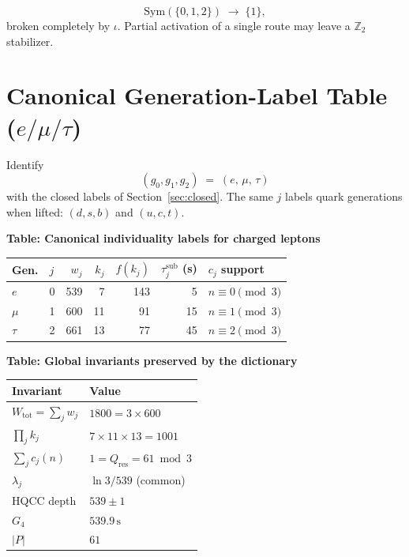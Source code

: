 \begin{corollary}
\[
\mathrm{Sym}(\{0,1,2\})\;\longrightarrow\;\{1\},
\]
broken completely by \(\iota\). Partial activation of a single route may leave
a \(\mathbb{Z}_2\) stabilizer.
\end{corollary}

\section{Canonical Generation-Label Table (\(e/\mu/\tau\))}
\label{sec:table}

\begin{definition}
\label{def:leptons}
Identify
\[
(g_0,g_1,g_2) \;=\; (e,\,\mu,\,\tau)
\]
with the closed labels of Section~\ref{sec:closed}. The same \(j\) labels quark
generations when lifted: \((d,s,b)\) and \((u,c,t)\).
\end{definition}

\begin{table}[ht]
\centering
\textbf{Table: Canonical individuality labels for charged leptons}
\label{tab:labels}\\[0.5em]
\begin{tabular}{@{}llrrrrl@{}}
\toprule
Gen. & \(j\) & \(w_j\) & \(k_j\) & \(f(k_j)\) & \(\tau_j^{\mathrm{sub}}\) (s) & \(c_j\) support \\
\midrule
\(e\)   & 0 & 539 & 7  & 143 & 5  & \(n\equiv 0\pmod{3}\) \\
\(\mu\) & 1 & 600 & 11 & 91  & 15 & \(n\equiv 1\pmod{3}\) \\
\(\tau\)& 2 & 661 & 13 & 77  & 45 & \(n\equiv 2\pmod{3}\) \\
\bottomrule
\end{tabular}
\end{table}

\begin{table}[ht]
\centering
\textbf{Table: Global invariants preserved by the dictionary}
\label{tab:invariants}\\[0.5em]
\begin{tabular}{@{}ll@{}}
\toprule
Invariant & Value \\
\midrule
\(W_{\mathrm{tot}}=\sum_j w_j\) & \(1800=3\times 600\) \\
\(\prod_j k_j\) & \(7\times 11\times 13=1001\) \\
\(\sum_j c_j(n)\) & \(1=Q_{\mathrm{res}}=61\bmod 3\) \\
\(\lambda_j\) & \(\ln 3/539\) (common) \\
HQCC depth & \(539\pm 1\) \\
\(G_4\) & \(539.9\,\mathrm{s}\) \\
\(|P|\) & \(61\) \\
\bottomrule
\end{tabular}
\end{table}

